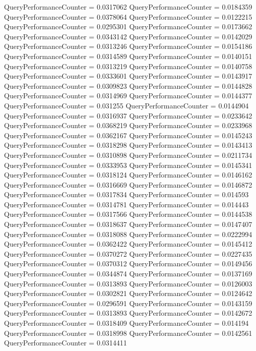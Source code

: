 \documentclass[9pt]{article}
\theoremstyle{plain}
\theoremstyle{definition}
\theoremstyle{remark}
\numberwithin{equation}{section}
\begin{document}
QueryPerformanceCounter  =  0.0317062
QueryPerformanceCounter  =  0.0184359
QueryPerformanceCounter  =  0.0378064
QueryPerformanceCounter  =  0.0122215
QueryPerformanceCounter  =  0.0295301
QueryPerformanceCounter  =  0.0173662
QueryPerformanceCounter  =  0.0343142
QueryPerformanceCounter  =  0.0142029
QueryPerformanceCounter  =  0.0313246
QueryPerformanceCounter  =  0.0154186
QueryPerformanceCounter  =  0.0314589
QueryPerformanceCounter  =  0.0140151
QueryPerformanceCounter  =  0.0313219
QueryPerformanceCounter  =  0.0140758
QueryPerformanceCounter  =  0.0333601
QueryPerformanceCounter  =  0.0143917
QueryPerformanceCounter  =  0.0309823
QueryPerformanceCounter  =  0.0144828
QueryPerformanceCounter  =  0.0314969
QueryPerformanceCounter  =  0.0144377
QueryPerformanceCounter  =  0.031255
QueryPerformanceCounter  =  0.0144904
QueryPerformanceCounter  =  0.0316937
QueryPerformanceCounter  =  0.0233642
QueryPerformanceCounter  =  0.0368219
QueryPerformanceCounter  =  0.0233968
QueryPerformanceCounter  =  0.0362167
QueryPerformanceCounter  =  0.0145243
QueryPerformanceCounter  =  0.0318298
QueryPerformanceCounter  =  0.0143413
QueryPerformanceCounter  =  0.0310898
QueryPerformanceCounter  =  0.0211734
QueryPerformanceCounter  =  0.0333953
QueryPerformanceCounter  =  0.0145341
QueryPerformanceCounter  =  0.0318124
QueryPerformanceCounter  =  0.0146162
QueryPerformanceCounter  =  0.0316669
QueryPerformanceCounter  =  0.0146872
QueryPerformanceCounter  =  0.0317834
QueryPerformanceCounter  =  0.014593
QueryPerformanceCounter  =  0.0314781
QueryPerformanceCounter  =  0.014443
QueryPerformanceCounter  =  0.0317566
QueryPerformanceCounter  =  0.0144538
QueryPerformanceCounter  =  0.0318637
QueryPerformanceCounter  =  0.0147407
QueryPerformanceCounter  =  0.0318088
QueryPerformanceCounter  =  0.0222994
QueryPerformanceCounter  =  0.0362422
QueryPerformanceCounter  =  0.0145412
QueryPerformanceCounter  =  0.0370272
QueryPerformanceCounter  =  0.0227435
QueryPerformanceCounter  =  0.0370312
QueryPerformanceCounter  =  0.0149456
QueryPerformanceCounter  =  0.0344874
QueryPerformanceCounter  =  0.0137169
QueryPerformanceCounter  =  0.0313893
QueryPerformanceCounter  =  0.0126003
QueryPerformanceCounter  =  0.0302821
QueryPerformanceCounter  =  0.0124642
QueryPerformanceCounter  =  0.0296591
QueryPerformanceCounter  =  0.0143159
QueryPerformanceCounter  =  0.0313893
QueryPerformanceCounter  =  0.0142672
QueryPerformanceCounter  =  0.0318409
QueryPerformanceCounter  =  0.014194
QueryPerformanceCounter  =  0.0318998
QueryPerformanceCounter  =  0.0142561
QueryPerformanceCounter  =  0.0314411
\end{document}
